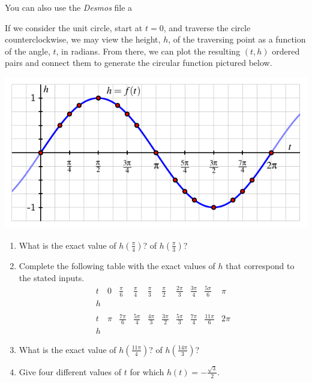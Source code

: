 \documentclass[nooutcomes]{ximera}
\begin{document}
You can also use the \emph{Desmos} file a

\begin{center}  
\end{center}

\begin{exploration}

If we consider the unit circle, start at \(t = 0\), and traverse the circle counterclockwise, we may view the height, \(h\), of the traversing point as a function of the angle, \(t\), in radians.  From there, we can plot the resulting \((t,h)\) ordered pairs and connect them to generate the circular function pictured below.

\begin{image}
\includegraphics{sine-labeling-graph.pdf}
\end{image}

\begin{enumerate}[label=\alph*.]
\item
What is the exact value of \(h\left( \frac{\pi}{4} \right)\)? of \(h\left( \frac{\pi}{3} \right)\)?%
\item
Complete the following table with the exact values of \(h\) that correspond to the stated inputs.%
\[
\begin{array}{llllllllll}
t&0&\frac{\pi}{6}&\frac{\pi}{4}&\frac{\pi}{3}&\frac{\pi}{2}&\frac{2\pi}{3}&\frac{3\pi}{4}&\frac{5\pi}{6}&\pi\\
\hline
h&&&&&&&&&\\
&&&&&&&&&\\
t&\pi&\frac{7\pi}{6}&\frac{5\pi}{4}&\frac{4\pi}{3}&\frac{3\pi}{2}&\frac{5\pi}{3}&\frac{7\pi}{4}&\frac{11\pi}{6}&2\pi\\
\hline
h&&&&&&&&&
\end{array}
\]
\item
What is the exact value of \(h\left( \frac{11\pi}{4} \right)\)? of \(h\left( \frac{14\pi}{3} \right)\)?%
\item
Give four different values of \(t\) for which \(h(t) = -\frac{\sqrt{3}}{2}\).%
\end{enumerate}

\end{exploration}
\end{document}
